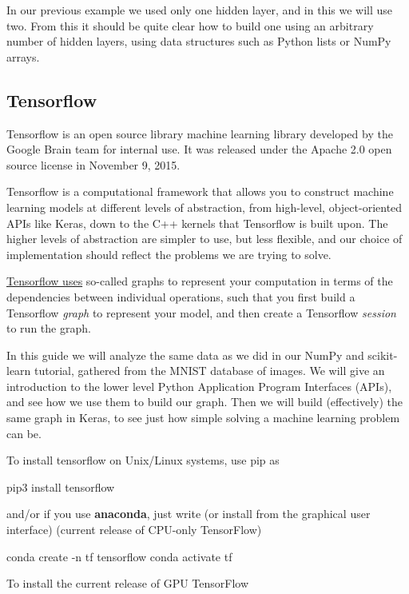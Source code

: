 \documentclass[%
oneside,                 %
final,                   %
10pt]{article}
\begin{document}
In our previous example we used only one hidden layer, and in this we will use two. From this it should be quite
clear how to build one using an arbitrary number of hidden layers, using data structures such as Python lists or
NumPy arrays.

\subsection{Tensorflow}

Tensorflow is an open source library machine learning library
developed by the Google Brain team for internal use. It was released
under the Apache 2.0 open source license in November 9, 2015.

Tensorflow is a computational framework that allows you to construct
machine learning models at different levels of abstraction, from
high-level, object-oriented APIs like Keras, down to the C++ kernels
that Tensorflow is built upon. The higher levels of abstraction are
simpler to use, but less flexible, and our choice of implementation
should reflect the problems we are trying to solve.

\href{{https://www.tensorflow.org/guide/graphs}}{Tensorflow uses} so-called graphs to represent your computation
in terms of the dependencies between individual operations, such that you first build a Tensorflow \emph{graph}
to represent your model, and then create a Tensorflow \emph{session} to run the graph.

In this guide we will analyze the same data as we did in our NumPy and
scikit-learn tutorial, gathered from the MNIST database of images. We
will give an introduction to the lower level Python Application
Program Interfaces (APIs), and see how we use them to build our graph.
Then we will build (effectively) the same graph in Keras, to see just
how simple solving a machine learning problem can be.

To install tensorflow on Unix/Linux systems, use pip as


\bpycod
pip3 install tensorflow

\epycod

and/or if you use \textbf{anaconda}, just write (or install from the graphical user interface)
(current release of CPU-only TensorFlow)



\bpycod
conda create -n tf tensorflow
conda activate tf

\epycod

To install the current release of GPU TensorFlow
\end{document}

